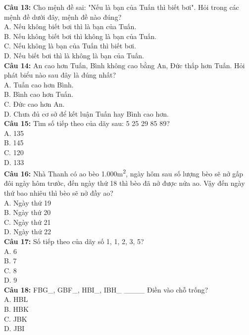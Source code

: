 \begin{multicols}{2}
\textbf{Câu 13:} Cho mệnh đề sai: "Nếu là bạn của Tuấn thì biết bơi". Hỏi trong các mệnh đề dưới đây, mệnh đề nào đúng? \\
A. Nếu không biết bơi thì là bạn của Tuấn. \\
B. Nếu không biết bơi thì không là bạn của Tuấn. \\
C. Nếu không là bạn của Tuấn thì biết bơi. \\
D. Nếu biết bơi thì là không là bạn của Tuấn. \\

\textbf{Câu 14:} An cao hơn Tuấn, Bình không cao bằng An, Đức thấp hơn Tuấn. Hỏi phát biểu nào sau đây là đúng nhất? \\
A. Tuấn cao hơn Bình. \\
B. Bình cao hơn Tuấn. \\
C. Đức cao hơn An. \\
D. Chưa đủ cơ sở để kết luận Tuấn hay Bình cao hơn. \\

\textbf{Câu 15:} Tìm số tiếp theo của dãy sau: 5 25 29 85 89? \\
A. 135 \\
B. 145 \\
C. 120 \\
D. 133 \\

\textbf{Câu 16:} Nhà Thanh có ao bèo 1.000m\textsuperscript{2}, ngày hôm sau số lượng bèo sẽ nở gấp đôi ngày hôm trước, đến ngày thứ 18 thì bèo đã nở được nửa ao. Vậy đến ngày thứ bao nhiêu thì bèo sẽ nở đầy ao? \\
A. Ngày thứ 19 \\
B. Ngày thứ 20 \\
C. Ngày thứ 21 \\
D. Ngày thứ 22 \\

\textbf{Câu 17:} Số tiếp theo của dãy số 1, 1, 2, 3, 5? \\
A. 6 \\
B. 7 \\
C. 8 \\
D. 9 \\

\textbf{Câu 18:} FBG\_, GBF\_, HBI\_, IBH\_ \_\_\_\_ Điền vào chỗ trống? \\
A. HBL \\
B. HBK \\
C. JBK \\
D. JBI \\


\end{multicols}
